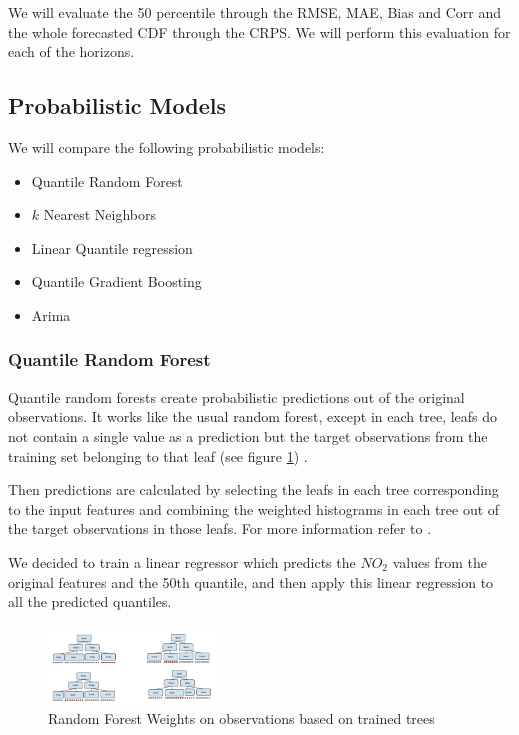 \documentclass[a4paper,twocolumn,5p]{elsarticle}
\begin{document}
We will evaluate the 50 percentile through the 
RMSE, MAE, Bias and Corr 
and the whole forecasted CDF through the CRPS. We will perform
this evaluation for each of the horizons.


\subsection{Probabilistic Models}
\label{sec:models}

We will compare the following probabilistic models:
\begin{itemize}
  \item Quantile Random Forest
  \item $k$ Nearest Neighbors
  \item Linear Quantile regression
  \item Quantile Gradient Boosting
  \item Arima
\end{itemize}

\subsubsection{Quantile Random Forest}

Quantile random forests create probabilistic predictions out of 
the original observations. It works like the usual random forest, 
except in each tree,
leafs do not contain a single value as a prediction but the target observations 
from the training set 
belonging to that leaf (see figure \ref{figure:qrandom}) . 

Then predictions are calculated by selecting the leafs in each tree
corresponding to the input features and combining the weighted 
histograms in each tree out of the target observations in those leafs. 
For more information refer to 
\cite{quantregforests}.

We decided to train a linear regressor
which predicts the $NO_2$ values from the original features and the 50th quantile, 
and then apply this linear regression 
to all the predicted quantiles. 

\begin{figure}
  \centering
  \includegraphics[width=0.4\textwidth]{quantile_random_forest}
  \caption{Random Forest Weights on observations based on trained trees}
  \label{figure:qrandom}
\end{figure}
\end{document}
